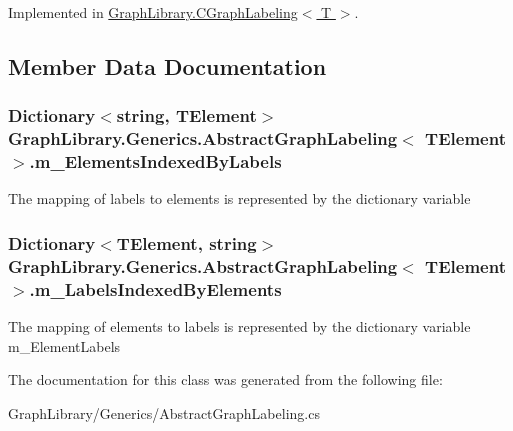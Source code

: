 Implemented in \hyperlink{class_graph_library_1_1_c_graph_labeling_abc0c9a99fd0ed7d21d3294c017587888}{Graph\+Library.\+C\+Graph\+Labeling$<$ T $>$}.



\subsection{Member Data Documentation}
\hypertarget{class_graph_library_1_1_generics_1_1_abstract_graph_labeling_a761265974897ab4d557e5896ab6df595}{}
\subsubsection[{m\+\_\+\+Elements\+Indexed\+By\+Labels}]{\setlength{\rightskip}{0pt plus 5cm}Dictionary$<$string, T\+Element$>$ {\bf Graph\+Library.\+Generics.\+Abstract\+Graph\+Labeling}$<$ T\+Element $>$.m\+\_\+\+Elements\+Indexed\+By\+Labels\hspace{0.3cm}{\ttfamily [protected]}}\label{class_graph_library_1_1_generics_1_1_abstract_graph_labeling_a761265974897ab4d557e5896ab6df595}


The mapping of labels to elements is represented by the dictionary variable 

\hypertarget{class_graph_library_1_1_generics_1_1_abstract_graph_labeling_a6da5ad0ff86fe7cb0a33a0bf7ca9d27d}{}
\subsubsection[{m\+\_\+\+Labels\+Indexed\+By\+Elements}]{\setlength{\rightskip}{0pt plus 5cm}Dictionary$<$T\+Element, string$>$ {\bf Graph\+Library.\+Generics.\+Abstract\+Graph\+Labeling}$<$ T\+Element $>$.m\+\_\+\+Labels\+Indexed\+By\+Elements\hspace{0.3cm}{\ttfamily [protected]}}\label{class_graph_library_1_1_generics_1_1_abstract_graph_labeling_a6da5ad0ff86fe7cb0a33a0bf7ca9d27d}


The mapping of elements to labels is represented by the dictionary variable m\+\_\+\+Element\+Labels 



The documentation for this class was generated from the following file\+:\begin{DoxyCompactItemize}
\item 
Graph\+Library/\+Generics/Abstract\+Graph\+Labeling.\+cs\end{DoxyCompactItemize}

